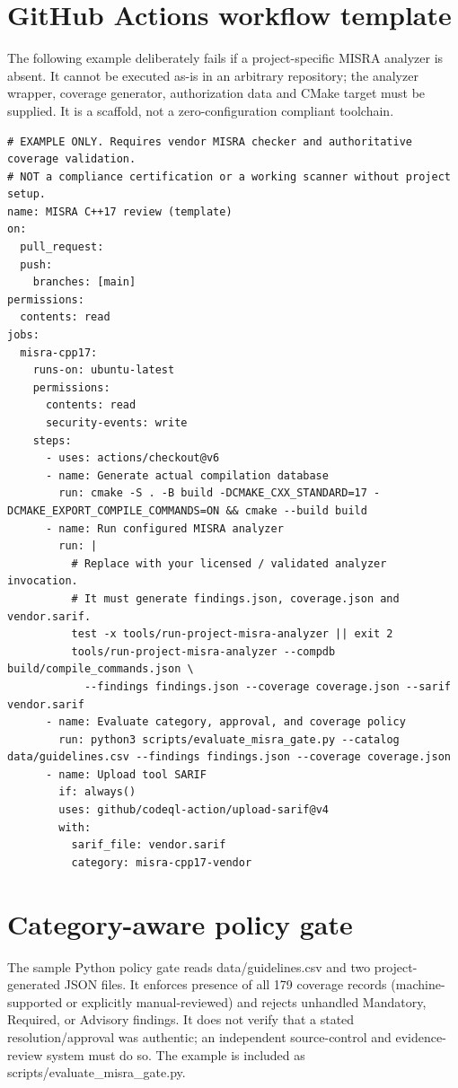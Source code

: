 \documentclass[10pt,letterpaper]{article}
\begin{document}
\section{GitHub Actions workflow template}
The following example deliberately fails if a project-specific MISRA analyzer is absent. It cannot be executed as-is in an arbitrary repository; the analyzer wrapper, coverage generator, authorization data and CMake target must be supplied. It is a scaffold, not a zero-configuration compliant toolchain.

\begin{lstlisting}[language={},caption={Proposed workflow; also provided at templates/misra-cpp.yml}]
# EXAMPLE ONLY. Requires vendor MISRA checker and authoritative coverage validation.
# NOT a compliance certification or a working scanner without project setup.
name: MISRA C++17 review (template)
on:
  pull_request:
  push:
    branches: [main]
permissions:
  contents: read
jobs:
  misra-cpp17:
    runs-on: ubuntu-latest
    permissions:
      contents: read
      security-events: write
    steps:
      - uses: actions/checkout@v6
      - name: Generate actual compilation database
        run: cmake -S . -B build -DCMAKE_CXX_STANDARD=17 -DCMAKE_EXPORT_COMPILE_COMMANDS=ON && cmake --build build
      - name: Run configured MISRA analyzer
        run: |
          # Replace with your licensed / validated analyzer invocation.
          # It must generate findings.json, coverage.json and vendor.sarif.
          test -x tools/run-project-misra-analyzer || exit 2
          tools/run-project-misra-analyzer --compdb build/compile_commands.json \
            --findings findings.json --coverage coverage.json --sarif vendor.sarif
      - name: Evaluate category, approval, and coverage policy
        run: python3 scripts/evaluate_misra_gate.py --catalog data/guidelines.csv --findings findings.json --coverage coverage.json
      - name: Upload tool SARIF
        if: always()
        uses: github/codeql-action/upload-sarif@v4
        with:
          sarif_file: vendor.sarif
          category: misra-cpp17-vendor
\end{lstlisting}

\section{Category-aware policy gate}
The sample Python policy gate reads data/guidelines.csv and two project-generated JSON files. It enforces presence of all 179 coverage records (machine-supported or explicitly manual-reviewed) and rejects unhandled Mandatory, Required, or Advisory findings. It does not verify that a stated resolution/approval was authentic; an independent source-control and evidence-review system must do so. The example is included as scripts/evaluate\_misra\_gate.py.
\end{document}
